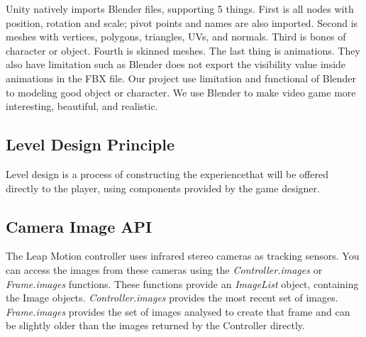 \documentclass[journal]{IEEEtran}										    %
\begin{document}
                Unity natively imports Blender files, supporting 5 things. 
                First is all nodes with position, rotation and scale; pivot 
                points and names are also imported. Second is meshes with vertices, 
                polygons, triangles, UVs, and normals. Third is bones of character 
                or object. Fourth is skinned meshes. The last thing is animations. 
                They also have limitation such as Blender does not export the 
                visibility value inside animations in the FBX file. Our project 
                use limitation and functional of Blender to modeling good object 
                or character. We use Blender to make video game more interesting, 
                beautiful, and realistic.

            \subsection{Level Design Principle}
                Level design is a process of constructing the experiencethat will 
                be offered directly to the player, using components provided by 
                the game designer.



            \subsection{Camera Image API}
                The Leap Motion controller uses infrared stereo cameras
                as tracking sensors. You can access the images from 
                these cameras using the \emph{Controller.images} or 
                \emph{Frame.images} functions. These functions provide 
                an \emph{ImageList} object, containing the Image objects. 
                \emph{Controller.images} provides the most recent set of images. 
                \emph{Frame.images} provides the set of images analysed to 
                create that frame and can be slightly older than the 
                images returned by the Controller directly. \\
\end{document}
